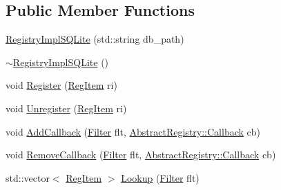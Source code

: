 \subsection*{Public Member Functions}
\begin{DoxyCompactItemize}
\item 
\hyperlink{classregistry_1_1RegistryImplSQLite_ad211242bf6438adad6ad01c3d5863f6f}{Registry\+Impl\+S\+Q\+Lite} (std\+::string db\+\_\+path)
\item 
\hyperlink{classregistry_1_1RegistryImplSQLite_a5d57b3f718213a7b8fbdc46e09b213af}{$\sim$\+Registry\+Impl\+S\+Q\+Lite} ()
\item 
void \hyperlink{classregistry_1_1RegistryImplSQLite_ac7781e882e1e072fde41ced3842eec6c}{Register} (\hyperlink{classregistry_1_1RegItem}{Reg\+Item} ri)
\item 
void \hyperlink{classregistry_1_1RegistryImplSQLite_aed678237358b3024a2afe2d4585e0c54}{Unregister} (\hyperlink{classregistry_1_1RegItem}{Reg\+Item} ri)
\item 
void \hyperlink{classregistry_1_1RegistryImplSQLite_ad9579736bcded70177bf9d8862cb79a0}{Add\+Callback} (\hyperlink{classregistry_1_1Filter}{Filter} flt, \hyperlink{classregistry_1_1AbstractRegistry_a08a798ca9ca1c4c983ebd2386ca3c315}{Abstract\+Registry\+::\+Callback} cb)
\item 
void \hyperlink{classregistry_1_1RegistryImplSQLite_a45b864d4111f994db1febfc622a83334}{Remove\+Callback} (\hyperlink{classregistry_1_1Filter}{Filter} flt, \hyperlink{classregistry_1_1AbstractRegistry_a08a798ca9ca1c4c983ebd2386ca3c315}{Abstract\+Registry\+::\+Callback} cb)
\item 
std\+::vector$<$ \hyperlink{classregistry_1_1RegItem}{Reg\+Item} $>$ \hyperlink{classregistry_1_1RegistryImplSQLite_ac2c846357de9bc83654193057a7edca1}{Lookup} (\hyperlink{classregistry_1_1Filter}{Filter} flt)
\end{DoxyCompactItemize}
